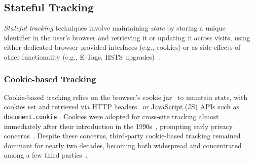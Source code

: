 \subsection{Stateful Tracking}
\label{sec:stateful-tracking}


\textit{Stateful tracking} techniques involve maintaining \textit{state} by storing a unique identifier in the user's browser and retrieving it or updating it across visits, using either dedicated browser-provided interfaces (e.g., cookies) or as side effects of other functionality (e.g., E-Tags, HSTS upgrades)~\cite{englehardtAutomatedDiscoveryPrivacy2018,ashkansoltaniFlashCookiesPrivacy2011,solomosTalesFaviconsCaches2021}.














\subsubsection{Cookie-based Tracking}
\label{sec:stateful-techniques-cookies}

Cookie-based tracking relies on the browser's cookie jar \symStorage\ to maintain state, with cookies set and retrieved via HTTP headers \symSharing\ or JavaScript (JS) APIs such as \texttt{document.cookie} \symExecution.
%
Cookies were adopted for cross-site tracking almost immediately after their introduction in the 1990s~\cite{montulliHTTPStateManagement1997}, prompting early privacy concerns~\cite{kristolHTTPCookiesStandards2001,SenatorRaisesPrivacy2001}.
%
Despite these concerns, third-party cookie-based tracking remained dominant for nearly two decades, becoming both widespread and concentrated among a few third parties~\cite{krishnamurthyPrivacyDiffusionWeb2009,lernerInternetJonesRaiders2016,englehardtOnlineTracking1millionsite2016,yuTrackingTrackers2016,karajWhoTracksMeShedding2019}.


